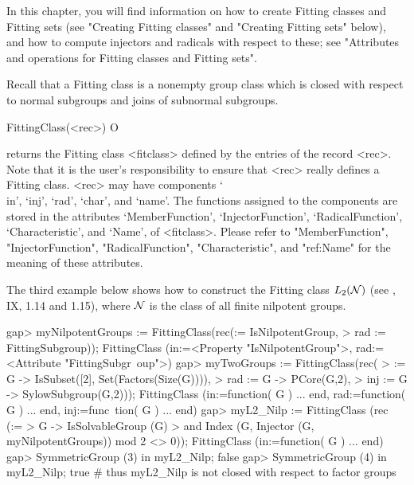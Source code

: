 
In this chapter, you will find information on how to create 
Fitting classes and Fitting sets (see "Creating Fitting classes" and
"Creating Fitting sets" below), and how to compute injectors and radicals
with respect to these;  see "Attributes and operations for Fitting classes
and Fitting sets".


\null


Recall that a Fitting class is a nonempty group class which is closed with respect
to normal subgroups and joins of subnormal subgroups.

\>FittingClass(<rec>) O

returns the Fitting class <fitclass> defined by the entries of the record
<rec>. Note that it is the user's responsibility to ensure that <rec> really
defines a Fitting class.
<rec> may have components `\\in', `inj', `rad', `char', and `name'. The
functions assigned to the components are stored in the attributes
`MemberFunction', `InjectorFunction',
`RadicalFunction', `Characteristic', and `Name', of <fitclass>. Please refer
to "MemberFunction",  "InjectorFunction", "RadicalFunction",
"Characteristic", and "ref:Name" for the meaning of these attributes.


 The third example below shows how to construct
the Fitting class $L_2({\cal N})$ (see \cite{DH92}, IX, 1.14 and 1.15), where
$\cal N$ is the class of all finite nilpotent groups.

\beginexample
gap> myNilpotentGroups := FittingClass(rec(\in := IsNilpotentGroup,
>    rad := FittingSubgroup));
FittingClass (in:=<Property "IsNilpotentGroup">, rad:=<Attribute "FittingSubgr\
oup">)
gap> myTwoGroups := FittingClass(rec(
>    \in := G -> IsSubset([2], Set(Factors(Size(G)))), 
>    rad :=  G -> PCore(G,2),
>    inj := G -> SylowSubgroup(G,2)));
FittingClass (in:=function( G ) ... end, rad:=function( G ) ... end, inj:=func\
tion( G ) ... end)
gap> myL2_Nilp := FittingClass (rec (\in := 
>     G -> IsSolvableGroup (G) 
>          and Index (G, Injector (G, myNilpotentGroups)) mod 2 <> 0));
FittingClass (in:=function( G ) ... end)
gap> SymmetricGroup (3) in myL2_Nilp;
false
gap> SymmetricGroup (4) in myL2_Nilp;
true   
# thus myL2_Nilp is not closed with respect to factor groups
\endexample

